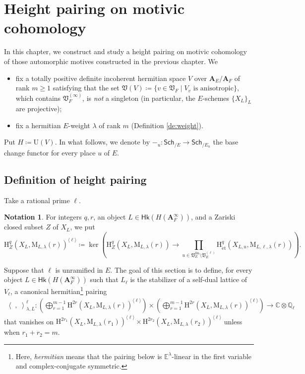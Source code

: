 \documentclass[12pt]{amsart}
\numberwithin{equation}{section}
\theoremstyle{plain}
\theoremstyle{definition}
\newtheorem{notation}[proposition]{Notation}
\theoremstyle{remark}
\renewcommand{\b}[1]{\mathbf{#1}}
\renewcommand{\d}[1]{\mathbb{#1}}
\newcommand{\f}[1]{\mathfrak{#1}}
\renewcommand{\r}[1]{\mathrm{#1}}
\renewcommand{\sf}[1]{\mathsf{#1}}
\renewcommand{\(}{\left(}
\renewcommand{\)}{\right)}
\newcommand{\res}{\mathbin{|}}
\newcommand{\ang}[1]{\langle{#1}\rangle}
\renewcommand{\geq}{\geqslant}
\newcommand{\bA}{\b A}
\newcommand{\dC}{\d C}
\newcommand{\dE}{\d E}
\newcommand{\dQ}{\d Q}
\newcommand{\fV}{\f V}
\newcommand{\rH}{\r H}
\newcommand{\rM}{\r M}
\newcommand{\rU}{\r U}
\newcommand{\llangle}{\left\langle}
\newcommand{\rrangle}{\right\rangle}
\newcommand{\et}{{\acute{\r{e}}\r{t}}}
\newcommand{\fin}{\r{fin}}
\newcommand{\Sch}{\sf{Sch}}
\newcommand{\Hk}{\sf{Hk}}
\DeclareMathOperator{\Ker}{ker}
\begin{document}
\section{Height pairing on motivic cohomology}
\label{ss:4}


In this chapter, we construct and study a height pairing on motivic cohomology of those automorphic motives constructed in the previous chapter. We
\begin{itemize}
  \item fix a totally positive definite incoherent hermitian space $V$ over $\bA_E/\bA_F$ of rank $m\geq 1$ satisfying that the set $\fV(V)\coloneqq\{v\in\fV_F\res V_v\text{ is anisotropic}\}$, which contains $\fV_F^{(\infty)}$, is \emph{not} a singleton (in particular, the $E$-schemes $\{X_L\}_L$ are projective);

  \item fix a hermitian $E$-weight $\lambda$ of rank $m$ (Definition \ref{de:weight}).
\end{itemize}
Put $H\coloneqq\rU(V)$. In what follows, we denote by $-_u\colon\Sch_{/E}\to\Sch_{/E_u}$ the base change functor for every place $u$ of $E$.


\subsection{Definition of height pairing}
\label{ss:height_pairing}

Take a rational prime $\ell$.

\begin{notation}\label{no:cohomological_trivial_ell}
For integers $q,r$, an object $L\in\Hk(H(\bA_F^\infty))$, and a Zariski closed subset $Z$ of $X_L$, we put
\[
\rH^q_Z(X_L,\rM_{L,\lambda}(r))^{\ang\ell}\coloneqq
\Ker\(\rH^q_Z(X_L,\rM_{L,\lambda}(r))\to\prod_{u\in\fV_E^\fin\setminus\fV_E^{(\ell)}}
\rH^q_{\et}(X_{L,u},\rM_{L,\ell,\lambda}(r))\).
\]
\end{notation}



Suppose that $\ell$ is unramified in $E$. The goal of this section is to define, for every object $L\in\Hk(H(\bA_F^\infty))$ such that $L_\ell$ is the stabilizer of a self-dual lattice of $V_\ell$, a canonical hermitian\footnote{Here, \emph{hermitian} means that the pairing below is $\dE^\lambda$-linear in the first variable and complex-conjugate symmetric.} pairing
\begin{align}\label{eq:height_pairing}
\llangle\;,\;\rrangle_{\lambda,L}^{\ell}\colon
\(\bigoplus_{r=1}^{m-1}\rH^{2r}(X_L,\rM_{L,\lambda}(r))^{\ang\ell}\)
\times\(\bigoplus_{r=1}^{m-1}\rH^{2r}(X_L,\rM_{L,\lambda}(r))^{\ang\ell}\)\to\dC\otimes\dQ_\ell
\end{align}
that vanishes on $\rH^{2r_1}(X_L,\rM_{L,\lambda}(r_1))^{\ang\ell}\times\rH^{2r_2}(X_L,\rM_{L,\lambda}(r_2))^{\ang\ell}$ unless when $r_1+r_2=m$.
\end{document}
